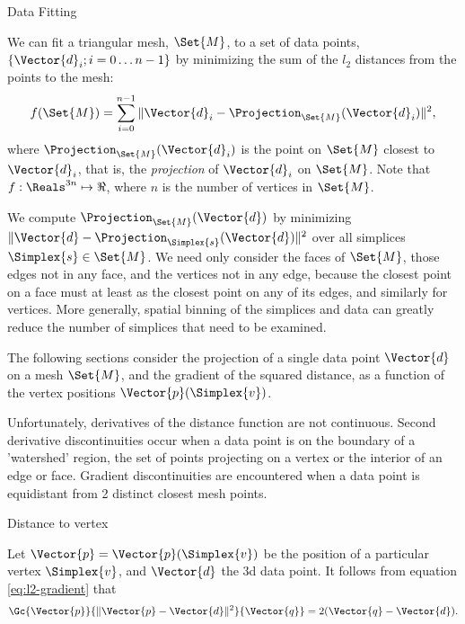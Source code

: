 \begin{plSection}{Data Fitting}
\label{sec:data-fitting}

We can fit a triangular mesh, $\Set{M}$, to a set of data points, 
$\{\Vector{d}_i; i=0 \ldots n-1\}$
by minimizing the sum of the $l_2$ distances from the points to the mesh:
\begin{equation}
f(\Set{M}) = \sum_{i=0}^{n-1} 
\| \Vector{d}_i - \Projection_\Set{M} (\Vector{d}_i) \|^2 ,
\end{equation}
where $\Projection_\Set{M} (\Vector{d}_i)$ 
is the point on $\Set{M}$ closest to $\Vector{d}_i$,
that is, the {\em projection} of $\Vector{d}_i$ on $\Set{M}$.
Note that $f:\Reals^{3n} \mapsto \Re$,
where $n$ is the number of vertices in $\Set{M}$.

We compute $\Projection_\Set{M} (\Vector{d})$ by minimizing  
$\| \Vector{d} - \Projection_\Simplex{s} (\Vector{d}) \|^2$
over all simplices $\Simplex{s} \in \Set{M}$.
We need only consider the faces of $\Set{M}$,
those edges not in any face,
and the vertices not in any edge,
because the closest point on a face must at least
as the closest point on any of its edges,
and similarly for vertices.
More generally, spatial binning of the simplices and data can greatly
reduce the number of simplices that need to be examined.

The following sections consider the projection of a single
data point $\Vector{d}$ on a mesh $\Set{M}$,
and the gradient of the squared distance,
as a function of the vertex positions $\Vector{p}(\Simplex{v})$.

Unfortunately, derivatives of the distance function are not continuous.
Second derivative discontinuities occur
when a data point is on the boundary
of a 'watershed' region, the set of points
projecting on a vertex or the interior of an edge or face.
Gradient discontinuities are encountered
when a data point is equidistant from 2 distinct closest mesh points.

\begin{plSection}{Distance to vertex}
\label{sec:Distance-to-vertex}

Let $\Vector{p} = \Vector{p}(\Simplex{v})$ be the position of a particular vertex $\Simplex{v}$,
and $\Vector{d}$ the 3d data point.
It follows from equation \ref{eq:l2-gradient} that
\begin{equation}
\label{eq:vertex-distance-gradient}
\Gc{\Vector{p}}{\| \Vector{p} - \Vector{d} \|^2}{\Vector{q}} = 2 ( \Vector{q} - \Vector{d} ).
\end{equation}


\end{plSection}
\end{plSection}
